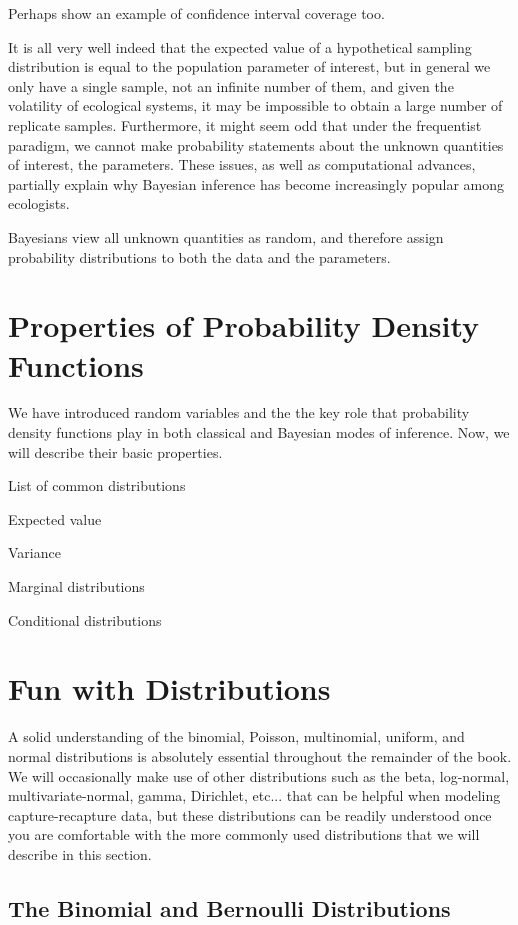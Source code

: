 Perhaps show an example of confidence interval coverage too.

It is all very well indeed that the expected value of a hypothetical
sampling distribution is equal to the population parameter of
interest, but in general we only have a single sample, not an infinite
number of them, and given the volatility of ecological
systems, it may be impossible to obtain a
large number of replicate samples. Furthermore, it might seem odd that
under the frequentist paradigm, we cannot make probability statements
about the unknown quantities of interest, the parameters. These
issues, as well as computational advances, partially explain why
Bayesian inference has become increasingly popular among ecologists.

Bayesians view all unknown quantities as random, and therefore assign
probability distributions to both the data and the parameters.



\section{Properties of Probability Density Functions}

We have introduced random variables and the the key role that
probability density functions
play in both classical and Bayesian modes of inference. Now, we will
describe their basic properties.

List of common distributions

Expected value

Variance

Marginal distributions

Conditional distributions


\section{Fun with Distributions}

A solid understanding of the binomial, Poisson, multinomial, uniform,
and normal distributions is absolutely essential throughout the
remainder of the book. We will occasionally make use of other
distributions such as the beta, log-normal, multivariate-normal,
gamma, Dirichlet, etc... that can be helpful when
modeling capture-recapture data, but these distributions can be
readily understood once you are comfortable with the more commonly
used distributions that we will describe in this section.

\subsection{The Binomial and Bernoulli Distributions}


